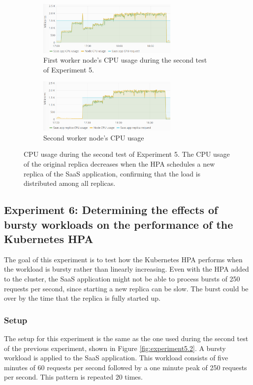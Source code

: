 \begin{figure}[H]
\centering
\begin{subfigure}[b]{\textwidth}
\centering
\includegraphics[width=0.75\textwidth]{Images/Experiments/CPU/Grafana/cpu-saas-hpa-li-1.PNG}
\caption{First worker node's CPU usage during the second test of Experiment 5.}
\label{fig:cpu-saas-hpa-li-1}
\end{subfigure}
\hfill
\begin{subfigure}[b]{\textwidth}
\centering
\includegraphics[width=0.75\textwidth]{Images/Experiments/CPU/Grafana/cpu-saas-hpa-li-2.PNG}
\caption{Second worker node's CPU usage}
\label{fig:cpu-saas-hpa-li-2}
\end{subfigure}
\hfill
\caption{CPU usage during the second test of Experiment 5. The CPU usage of the original replica decreases when the HPA schedules a new replica of the SaaS application, confirming that the load is distributed among all replicas.}
\label{fig:cpu-cas-hpa-li-2}
\end{figure}

\subsection{Experiment 6: Determining the effects of bursty workloads on the performance of the Kubernetes HPA}
The goal of this experiment is to test how the Kubernetes HPA performs when the workload is bursty rather than linearly increasing. Even with the HPA added to the cluster, the SaaS application might not be able to process bursts of 250 requests per second, since starting a new replica can be slow. The burst could be over by the time that the replica is fully started up.

\subsubsection{Setup}
The setup for this experiment is the same as the one used during the second test of the previous experiment, shown in Figure \ref{fig:experiment5.2}. A bursty workload is applied to the SaaS application. This workload consists of five minutes of 60 requests per second followed by a one minute peak of 250 requests per second. This pattern is repeated 20 times.  

